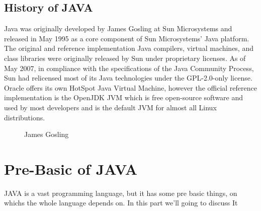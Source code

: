 \documentclass[A4 paper,openany]{book}  %
\begin{document}
\chapter{History of JAVA}
Java was originally developed by James Gosling\cite{Ref2}  at Sun Microsystems and released in May 1995 as a core component of Sun Microsystems' Java platform.
The original and reference implementation Java compilers, virtual machines, and class libraries were originally released by Sun under proprietary licenses.
As of May 2007, in compliance with the specifications of the Java Community Process, Sun had relicensed most of its Java technologies under the GPL-2.0-only license.
Oracle offers its own HotSpot Java Virtual Machine, however the official reference implementation is the OpenJDK JVM which is free open-source software and used by most developers
and is the default JVM for almost all Linux distributions.

% 
% 

\begin{figure}[htbp]
    \begin{center}
        \caption{James Gosling}
    \end{center}
\end{figure}


% 
% 
\part{Pre-Basic of JAVA}

JAVA is a vast programming language, but it has some pre basic things, on whichs the whole language depends on. In this part we'll going to discuss It
\end{document}
